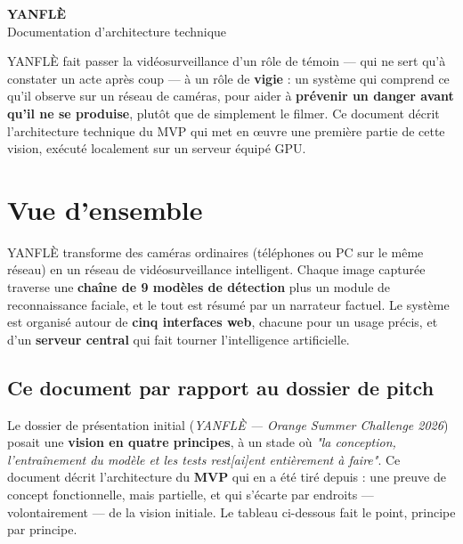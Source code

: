 \documentclass[11pt,a4paper]{article}
\begin{document}
\begin{tcolorbox}[colback=ykgreen, colframe=ykgreen, arc=2pt,
  left=18pt, right=18pt, top=16pt, bottom=16pt]
  {\color{white}\fontsize{30}{34}\selectfont\bfseries YANFL\`E}\\[4pt]
  {\color{ykgreenlight}\large Documentation d'architecture technique}
  \vspace{6pt}

  {\color{ykgreenlight}
  YANFL\`E fait passer la vid\'eosurveillance d'un r\^ole de t\'emoin --- qui ne sert qu'\`a constater
  un acte apr\`es coup --- \`a un r\^ole de \textbf{vigie} : un syst\`eme qui comprend ce qu'il observe
  sur un r\'eseau de cam\'eras, pour aider \`a \textbf{pr\'evenir un danger avant qu'il ne se
  produise}, plut\^ot que de simplement le filmer. Ce document d\'ecrit l'architecture technique du
  MVP qui met en \oe uvre une premi\`ere partie de cette vision, ex\'ecut\'e localement sur un serveur
  \'equip\'e GPU.
  }
\end{tcolorbox}

\vspace{10pt}

\renewcommand{\contentsname}{Table des mati\`eres}
\tableofcontents

\section{Vue d'ensemble}

YANFL\`E transforme des cam\'eras ordinaires (t\'el\'ephones ou PC sur le m\^eme r\'eseau) en un
r\'eseau de vid\'eosurveillance intelligent. Chaque image captur\'ee traverse une \textbf{cha\^ine de
9 mod\`eles de d\'etection} plus un module de reconnaissance faciale, et le tout est r\'esum\'e par un
narrateur factuel. Le syst\`eme est organis\'e autour de \textbf{cinq interfaces web}, chacune pour un
usage pr\'ecis, et d'un \textbf{serveur central} qui fait tourner l'intelligence artificielle.

\subsection*{Ce document par rapport au dossier de pitch}

Le dossier de pr\'esentation initial (\emph{YANFL\`E --- Orange Summer Challenge 2026}) posait une
\textbf{vision en quatre principes}, \`a un stade o\`u \emph{"la conception, l'entra\^inement du
mod\`ele et les tests rest[ai]ent enti\`erement \`a faire"}. Ce document d\'ecrit l'architecture du
\textbf{MVP} qui en a \'et\'e tir\'e depuis : une preuve de concept fonctionnelle, mais partielle, et
qui s'\'ecarte par endroits --- volontairement --- de la vision initiale. Le tableau ci-dessous fait
le point, principe par principe.
\end{document}
